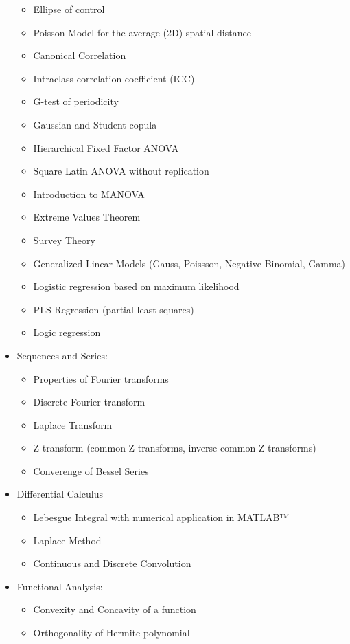 \begin{itemize}
\begin{itemize}
				\item Ellipse of control
				\item Poisson Model for the average (2D) spatial distance
				\item Canonical Correlation
				\item Intraclass correlation coefficient (ICC)
				\item G-test of periodicity
				\item Gaussian and Student copula
				\item Hierarchical Fixed Factor ANOVA
				\item Square Latin ANOVA without replication
				\item Introduction to MANOVA
				\item Extreme Values Theorem
				\item Survey Theory
				\item Generalized Linear Models (Gauss, Poissson, Negative Binomial, Gamma)
				\item Logistic regression based on maximum likelihood
				\item PLS Regression (partial least squares)
				\item Logic regression
			\end{itemize}
		\item Sequences and Series:
			\begin{itemize}
				\item Properties of Fourier transforms	
				\item Discrete Fourier transform			
				\item Laplace Transform
				\item Z transform (common Z transforms, inverse common Z transforms)
				\item Converenge of Bessel Series
			\end{itemize}
		\item Differential Calculus
			\begin{itemize}
				\item Lebesgue Integral with numerical application in MATLAB™				
				\item Laplace Method
				\item Continuous and Discrete Convolution
			\end{itemize}		
		\item Functional Analysis: 
			\begin{itemize}
				\item Convexity and Concavity of a function
				\item Orthogonality of Hermite polynomial

\end{itemize}
\end{itemize}
